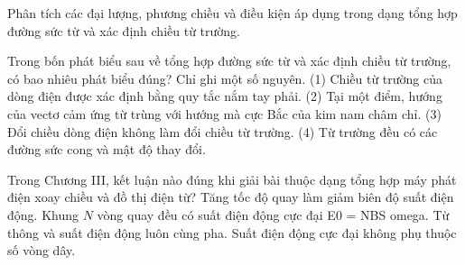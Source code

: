\begin{bt}
Phân tích các đại lượng, phương chiều và điều kiện áp dụng trong dạng tổng hợp đường sức từ và xác định chiều từ trường.
\end{bt}

\begin{ex}
Trong bốn phát biểu sau về tổng hợp đường sức từ và xác định chiều từ trường, có bao nhiêu phát biểu đúng? Chỉ ghi một số nguyên. (1) Chiều từ trường của dòng điện được xác định bằng quy tắc nắm tay phải. (2) Tại một điểm, hướng của vectơ cảm ứng từ trùng với hướng mà cực Bắc của kim nam châm chỉ. (3) Đổi chiều dòng điện không làm đổi chiều từ trường. (4) Từ trường đều có các đường sức cong và mật độ thay đổi.
\end{ex}

\begin{ex}
Trong Chương III, kết luận nào đúng khi giải bài thuộc dạng tổng hợp máy phát điện xoay chiều và đồ thị điện từ?
\choice
{Tăng tốc độ quay làm giảm biên độ suất điện động.}
{\True Khung $N$ vòng quay đều có suất điện động cực đại E0 = NBS omega.}
{Từ thông và suất điện động luôn cùng pha.}
{Suất điện động cực đại không phụ thuộc số vòng dây.}
\end{ex}

